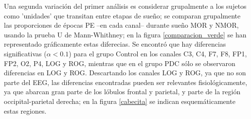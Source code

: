 \documentclass[12pt,a4paper]{mitthesis}
\begin{document}
Una segunda variaci\'on del primer an\'alisis es considerar grupalmente a los sujetos como 
'unidades' que transitan entre etapas de sue\~no; se comparan grupalmente las proporciones de 
\'epocas PE --en cada canal-- durante sue\~no MOR y NMOR, usando la prueba U de Mann-Whithney;
en la figura \ref{comparacion_verde} se han representado gr\'aficamente estas diferecias.
Se encontr\'o que hay diferencias significativas ($\alpha<0.1$) para el grupo Control en los 
canales C3, C4, F7, F8, FP1, FP2, O2, P4, LOG y ROG, mientras que en el grupo PDC s\'olo se
observaron diferencias en LOG y ROG.
Descartando los canales LOG y ROG, ya que no son parte del EEG, las diferencias encontradas 
pueden ser relevantes fisiol\'ogicamente, ya que abarcan gran parte de los l\'obulos frontal y 
parietal, y parte de la regi\'on occipital-parietal derecha; en la figura \ref{cabecita} se
indican esquem\'aticamente estas regiones.
\end{document}
